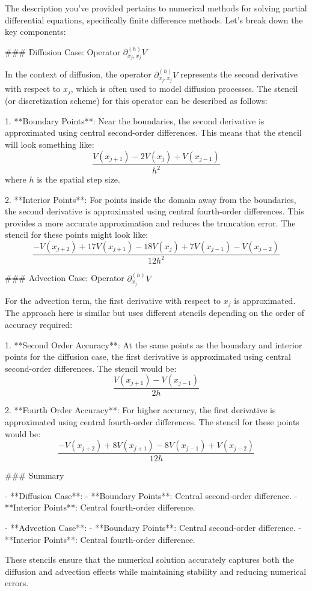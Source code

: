 The description you've provided pertains to numerical methods for solving partial differential equations, specifically finite difference methods. Let's break down the key components:

### Diffusion Case: Operator \(\partial^{(h)}_{x_j,x_j} V\)

In the context of diffusion, the operator \(\partial^{(h)}_{x_j,x_j} V\) represents the second derivative with respect to \(x_j\), which is often used to model diffusion processes. The stencil (or discretization scheme) for this operator can be described as follows:

1. **Boundary Points**: Near the boundaries, the second derivative is approximated using central second-order differences. This means that the stencil will look something like:
   \[
   \frac{V(x_{j+1}) - 2V(x_j) + V(x_{j-1})}{h^2}
   \]
   where \(h\) is the spatial step size.

2. **Interior Points**: For points inside the domain away from the boundaries, the second derivative is approximated using central fourth-order differences. This provides a more accurate approximation and reduces the truncation error. The stencil for these points might look like:
   \[
   \frac{-V(x_{j+2}) + 17V(x_{j+1}) - 18V(x_j) + 7V(x_{j-1}) - V(x_{j-2})}{12h^2}
   \]

### Advection Case: Operator \(\partial^{(h)}_{x_j} V\)

For the advection term, the first derivative with respect to \(x_j\) is approximated. The approach here is similar but uses different stencils depending on the order of accuracy required:

1. **Second Order Accuracy**: At the same points as the boundary and interior points for the diffusion case, the first derivative is approximated using central second-order differences. The stencil would be:
   \[
   \frac{V(x_{j+1}) - V(x_{j-1})}{2h}
   \]

2. **Fourth Order Accuracy**: For higher accuracy, the first derivative is approximated using central fourth-order differences. The stencil for these points would be:
   \[
   \frac{-V(x_{j+2}) + 8V(x_{j+1}) - 8V(x_{j-1}) + V(x_{j-2})}{12h}
   \]

### Summary

- **Diffusion Case**:
  - **Boundary Points**: Central second-order difference.
  - **Interior Points**: Central fourth-order difference.

- **Advection Case**:
  - **Boundary Points**: Central second-order difference.
  - **Interior Points**: Central fourth-order difference.

These stencils ensure that the numerical solution accurately captures both the diffusion and advection effects while maintaining stability and reducing numerical errors.